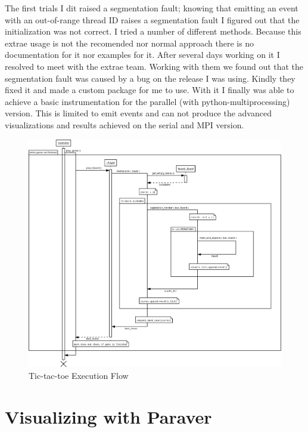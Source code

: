 The first trials I dit raised a segmentation fault; knowing that emitting an event with an out-of-range thread ID raises a segmentation fault I figured out that the initialization was not correct. I tried a number of different methods. Because this extrae usage is not the recomended nor normal approach there is no documentation for it nor examples for it. After several days working on it I resolved to meet with the extrae team. Working with them we found out that the segmentation fault was caused by a bug on the release I was using. Kindly they fixed it and made a custom package for me to use. With it I finally was able to achieve a basic instrumentation for the parallel (with python-multiprocessing) version. This is limited to emit events and can not produce the advanced visualizations and results achieved on the serial and MPI version.

\begin{landscape}
\begin{figure}
\includegraphics[width=20cm]{img/tic-tac-toe.png}
\caption{Tic-tac-toe Execution Flow}
\label{fig:tic-tac-toe}
\end{figure}
\end{landscape}


\section{Visualizing with Paraver}



